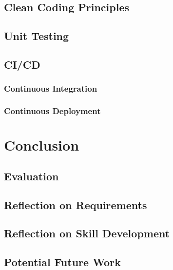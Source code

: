\documentclass[a4paper,11pt]{article}
\begin{document}
\subsection{Clean Coding Principles}
\subsection{Unit Testing}
\subsection{CI/CD}
\subsubsection{Continuous Integration}
\subsubsection{Continuous Deployment}

\section{Conclusion}
\subsection{Evaluation}
\subsection{Reflection on Requirements}
\subsection{Reflection on Skill Development}
\subsection{Potential Future Work}
\end{document}
